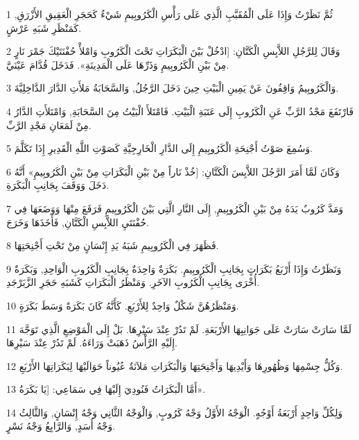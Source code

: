 \par 1 ثُمَّ نَظَرْتُ وَإِذَا عَلَى الْمُقَبَّبِ الَّذِي عَلَى رَأْسِ الْكَرُوبِيمِ شَيْءٌ كَحَجَرِ الْعَقِيقِ الأَزْرَقِ, كَمَنْظَرِ شَبَهِ عَرْشٍ.
\par 2 وَقَالَ لِلرَّجُلِ اللاَّبِسِ الْكَتَّانِ: [ادْخُلْ بَيْنَ الْبَكَرَاتِ تَحْتَ الْكَرُوبِ وَامْلأْ حُفْنَتَيْكَ جَمْرَ نَارٍ مِنْ بَيْنِ الْكَرُوبِيمِ وَذَرِّهَا عَلَى الْمَدِينَةِ». فَدَخَلَ قُدَّامَ عَيْنَيَّ.
\par 3 وَالْكَرُوبِيمُ وَاقِفُونَ عَنْ يَمِينِ الْبَيْتِ حِينَ دَخَلَ الرَّجُلُ, وَالسَّحَابَةُ مَلأَتِ الدَّارَ الدَّاخِلِيَّةَ.
\par 4 فَارْتَفَعَ مَجْدُ الرَّبِّ عَنِ الْكَرُوبِ إِلَى عَتَبَةِ الْبَيْتِ. فَامْتَلأَ الْبَيْتُ مِنَ السَّحَابَةِ, وَامْتَلأَتِ الدَّارُ مِنْ لَمَعَانِ مَجْدِ الرَّبِّ.
\par 5 وَسُمِعَ صَوْتُ أَجْنِحَةِ الْكَرُوبِيمِ إِلَى الدَّارِ الْخَارِجِيَّةِ كَصَوْتِ اللَّهِ الْقَدِيرِ إِذَا تَكَلَّمَ.
\par 6 وَكَانَ لَمَّا أَمَرَ الرَّجُلَ اللاَّبِسَ الْكَتَّانِ: [خُذْ نَاراً مِنْ بَيْنِ الْبَكَرَاتِ مِنْ بَيْنِ الْكَرُوبِيمِ» أَنَّهُ دَخَلَ وَوَقَفَ بِجَانِبِ الْبَكَرَةِ.
\par 7 وَمَدَّ كَرُوبٌ يَدَهُ مِنْ بَيْنِ الْكَرُوبِيمِ, إِلَى النَّارِ الَّتِي بَيْنَ الْكَرُوبِيمِ فَرَفَعَ مِنْهَا وَوَضَعَهَا فِي حُفْنَتَيِ اللاَّبِسِ الْكَتَّانِ, فَأَخَذَهَا وَخَرَجَ.
\par 8 فَظَهَرَ فِي الْكَرُوبِيمِ شَبَهُ يَدِ إِنْسَانٍ مِنْ تَحْتِ أَجْنِحَتِهَا.
\par 9 وَنَظَرْتُ وَإِذَا أَرْبَعُ بَكَرَاتٍ بِجَانِبِ الْكَرُوبِيمِ. بَكَرَةٌ وَاحِدَةٌ بِجَانِبِ الْكَرُوبِ الْوَاحِدِ, وَبَكَرَةٌ أُخْرَى بِجَانِبِ الْكَرُوبِ الآخَرِ. وَمَنْظَرُ الْبَكَرَاتِ كَشَبَهِ حَجَرِ الزَّبَرْجَدِ.
\par 10 وَمَنْظَرُهُنَّ شَكْلٌ وَاحِدٌ لِلأَرْبَعِ. كَأَنَّهُ كَانَ بَكَرَةً وَسَطَ بَكَرَةٍ.
\par 11 لَمَّا سَارَتْ سَارَتْ عَلَى جَوَانِبِهَا الأَرْبَعَةِ. لَمْ تَدُرْ عِنْدَ سَيْرِهَا. بَلْ إِلَى الْمَوْضِعِ الَّذِي تَوَجَّهَ إِلَيْهِ الرَّأْسُ ذَهَبَتْ وَرَاءَهُ. لَمْ تَدُرْ عِنْدَ سَيْرِهَا.
\par 12 وَكُلُّ جِسْمِهَا وَظُهُورِهَا وَأَيْدِيهَا وَأَجْنِحَتِهَا وَالْبَكَرَاتِ مَلآنَةٌ عُيُوناً حَوَالَيْهَا لِبَكَرَاتِهَا الأَرْبَعِ.
\par 13 أَمَّا الْبَكَرَاتُ فَنُودِيَ إِلَيْهَا فِي سَمَاعِي: [يَا بَكَرَةُ».
\par 14 وَلِكُلِّ وَاحِدٍ أَرْبَعَةُ أَوْجُهٍ. الْوَجْهُ الأَوَّلُ وَجْهُ كَرُوبٍ, وَالْوَجْهُ الثَّانِي وَجْهُ إِنْسَانٍ, وَالثَّالِثُ وَجْهُ أَسَدٍ, وَالرَّابِعُ وَجْهُ نَسْرٍ.

